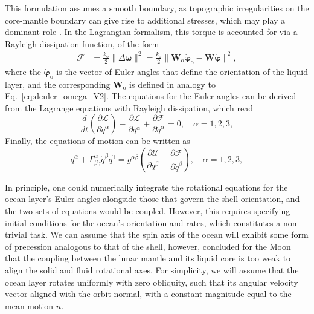 \documentclass[lineno, pdflatex,sn-mathphys-ay]{sn-jnl}
\theoremstyle{thmstyleone}%
\theoremstyle{thmstyletwo}%
\theoremstyle{thmstylethree}%
\renewcommand{\vec}[1]{\boldsymbol{#1}}
\begin{document}
This formulation assumes a smooth boundary, as topographic irregularities on the core-mantle
boundary can give rise to additional stresses, which may play a dominant role \citep[see e.g.,][]{1981RSPTA.303..327Y}.
%
In the Lagrangian formalism, this torque is accounted for via a Rayleigh dissipation function, of the form
\begin{align}
\mathcal{F} &= \frac{k_\mathrm{o}}{2}  \| \Delta \vec{\omega} \|^2
= 
\frac{k_\mathrm{o}}{2}  \| \vec{W}_{\mathrm{o}}\dot{\vec{\varphi}}_{\mathrm{o}} - \vec{W}\dot{\vec{\varphi}} \|^2,
\end{align}
%
where the $\dot{\vec{\varphi}}_{\mathrm{o}}$ is the vector of Euler angles that define the orientation of the liquid layer, and the corresponding $\vec{W}_{\mathrm{o}}$ is defined in analogy to Eq.~\eqref{eq:deuler_omega_V2}.
%
The equations for the Euler angles can be derived from the Lagrange equations with Rayleigh dissipation, which read
%
\begin{equation}
	\frac{d}{dt}\left(\frac{\partial \mathcal{L}}{\partial \dot{q}^\alpha}\right) - \frac{\partial \mathcal{L}}{\partial q^\alpha}  
+ \frac{\partial \mathcal{F}}{\partial \dot{q}^\alpha}= 0, \quad \alpha = 1, 2,3,
\end{equation}
%
%
%
Finally, the equations of motion can be written as
\begin{equation}\label{eq:geodesic_potential_ocean_V2}
	\ddot{q}^\alpha + 
	\Gamma^{\alpha}_{\beta\gamma} \dot{q}^\beta \dot{q}^\gamma =
	g^{\alpha\beta} \left( \frac{\partial \mathcal{U}}{\partial q^\beta} - \frac{\partial \mathcal{F}}{\partial \dot{q}^\beta} \right), \quad \alpha = 1,2,3,
\end{equation}


In principle, one could numerically integrate the rotational equations for the ocean layer's Euler angles alongside those that govern the shell orientation, and the two sets of equations would be coupled. However, this requires specifying initial conditions for the ocean's orientation and rates, which constitutes a non-trivial task. 
We can assume that the spin axis of the ocean will exhibit some form of precession analogous to that of the shell, however,
\cite{1967JGR....72.3135G} concluded for the Moon that the coupling between the lunar mantle and its liquid core is too weak to align the solid and fluid rotational axes. %
%
For simplicity, we will assume that the ocean layer rotates uniformly with zero obliquity, such that its angular velocity vector aligned with the orbit normal, with a constant magnitude equal to the mean motion $n$.
\end{document}
